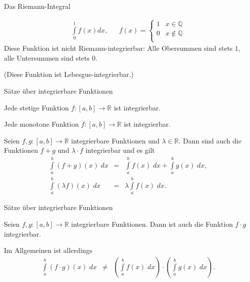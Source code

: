 \documentclass[german]{beamer}
\newcommand{\bq}{\begin{eqnarray*}}
\newcommand{\eq}{\end{eqnarray*}}
\begin{document}
\begin{frame}{Das Riemann-Integral}

\begin{example}
\bq
 \int\limits_0^1 f\left(x\right) dx,
 & &
 f\left(x\right)
 = 
 \left\{ \begin{array}{ll}
  1 & x \in \mathbb{Q} \\
  0 & x \notin \mathbb{Q} \\
 \end{array} \right.
\eq
Diese Funktion ist nicht Riemann-integrierbar: 
Alle Obersummen sind stets $1$, alle Untersummen sind stets $0$.
\end{example}

\vspace*{15mm}
(Diese Funktion ist Lebesgue-integrierbar.)

\end{frame}

\begin{frame}{S\"atze \"uber integrierbare Funktionen}

\begin{theorem}
Jede stetige Funktion $f : [a,b] \rightarrow \mathbb R$ ist integrierbar.
\end{theorem}

\begin{theorem}
Jede monotone Funktion $f : [a,b] \rightarrow \mathbb R$ ist integrierbar.
\end{theorem}

\begin{theorem}
Seien $f, g : [a,b] \rightarrow \mathbb R$ integrierbare Funktionen und $\lambda \in \mathbb R$.
Dann sind auch die Funktionen $f+g$ und $\lambda \cdot f$ integrierbar und es gilt
{\footnotesize
\bq
 \int\limits_a^b (f+g)(x) \; dx & = & \int\limits_a^b f(x) \; dx + \int\limits_a^b g(x) \; dx,
 \nonumber \\
 \int\limits_a^b (\lambda f)(x) \; dx & = & \lambda \int\limits_a^b f(x) \; dx.
\eq
}
\end{theorem}

\end{frame}

\begin{frame}{S\"atze \"uber integrierbare Funktionen}

\begin{theorem}
Seien $f, g : [a,b] \rightarrow \mathbb R$ integrierbare Funktionen.
Dann ist auch die Funktion $f \cdot g$ integrierbar.
\end{theorem}

Im Allgemeinen ist allerdings
\bq
 \int\limits_a^b (f \cdot g)(x) \; dx & \neq & \left( \int\limits_a^b f(x) \; dx \right)
 \cdot \left(  \int\limits_a^b g(x) \; dx \right).
\eq

\end{frame}
\end{document}
